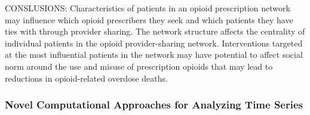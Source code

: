 \begin{itemize}
CONSLUSIONS: Characteristics of patients in an opioid prescription network may influence which opioid prescribers they seek and which patients they have ties with through provider sharing. The network structure affects the centrality of individual patients in the opioid provider-sharing network. Interventions targeted at the most influential patients in the network may have potential to affect social norm around the use and misuse of prescription opioids that may lead to reductions in opioid-related overdose deaths. 


\end{itemize}

\subsubsection*{Novel Computational Approaches for Analyzing Time Series}

